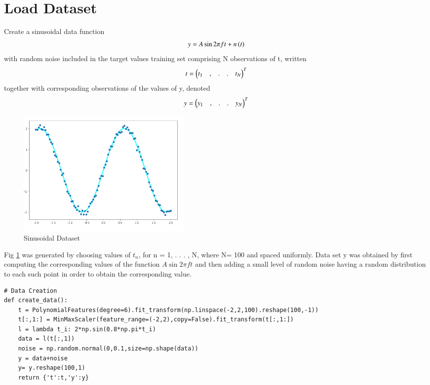 \documentclass[journal,12pt,twocolumn]{IEEEtran}
\begin{document}
\section{Load Dataset}
Create a sinusoidal data function
\begin{align}
    y = A\sin{2\pi{ft}}+n\left(t\right)
\end{align}
with random noise included in the target values training set comprising N observations of t,
written
\begin{align}
    t=\begin{pmatrix}t_1 &,&.&.& t_N\end{pmatrix}^T 
\end{align}
together with corresponding observations of the values
of y, denoted 
\begin{align}
    y=\begin{pmatrix}y_1 &,&.&.& y_N\end{pmatrix}^T
\end{align}
\begin{figure}[!h]
\begin{center}
\includegraphics[width=3.4in]{a1.png}
\end{center}
\caption{Sinusoidal Dataset}
\label{fig:1}
\end{figure}
Fig \ref{fig:1} was generated by choosing
values of $t_n$, for n = 1, . . . , N, where N= 100 and spaced uniformly. Data set y was obtained by first computing the corresponding values of the function $A\sin2\pi{ft}$ and then adding a small level of random noise having a random distribution to each such point in order to obtain the corresponding value.
\begin{lstlisting}
# Data Creation
def create_data():
    t = PolynomialFeatures(degree=6).fit_transform(np.linspace(-2,2,100).reshape(100,-1))
    t[:,1:] = MinMaxScaler(feature_range=(-2,2),copy=False).fit_transform(t[:,1:])
    l = lambda t_i: 2*np.sin(0.8*np.pi*t_i)
    data = l(t[:,1])
    noise = np.random.normal(0,0.1,size=np.shape(data))
    y = data+noise
    y= y.reshape(100,1)
    return {'t':t,'y':y}
\end{lstlisting}
\end{document}
